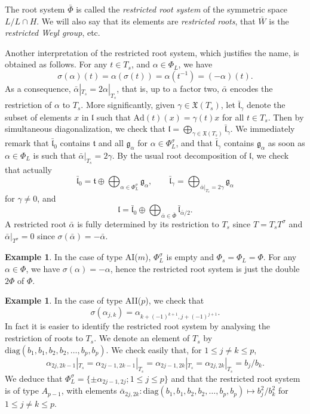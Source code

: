 \documentclass{amsart}
\theoremstyle{definition}
\newtheorem{exa}[thm]{Example}
\begin{document}
The root system $\bar{\Phi}$ is called the \emph{restricted root system} of the 
symmetric space $L/L\cap H$. We will also say that its elements are 
\emph{restricted roots}, that $\bar{W}$ is the \emph{restricted Weyl group}, 
etc.

Another interpretation of the restricted root system, which justifies the name, 
is obtained as follows. 
For any $t\in T_s$, and $\alpha\in \Phi_L$, we have 
\[
\sigma(\alpha)(t)=\alpha(\sigma(t))=\alpha(t^{-1})=(-\alpha)(t).
\]
As a consequence, $\bar{\alpha}|_{T_s}=2\alpha|_{T_s}$, 
that is, up to a factor two, $\bar{\alpha}$ encodes the restriction 
of $\alpha$ to $T_s$.
More significantly, given $\gamma\in \mathfrak{X}(T_s)$, let 
$\bar{\mathfrak{l}}_{\gamma}$ denote the subset of elements $x$ in 
$\mathfrak{l}$ such that $\mathrm{Ad}(t)(x)=\gamma(t)x$ for 
all $t\in T_s$. Then by simultaneous diagonalization, we check that 
$
\mathfrak{l} = \bigoplus_{\gamma\in \mathfrak{X}(T_s)} \bar{\mathfrak{l}}_{\gamma}.
$
We immediately remark that 
$\bar{\mathfrak{l}}_0$ contains $\mathfrak{t}$ and all 
$\mathfrak{g}_{\alpha}$ for $\alpha \in  \Phi_L^{\sigma}$, and 
that $\bar{\mathfrak{l}}_{\gamma}$ contains $\mathfrak{g}_{\alpha}$
as soon as $\alpha\in \Phi_L$ is such that $\bar{\alpha}|_{T_s}=2\gamma$.
By the usual root decomposition of $\mathfrak{l}$, we check that 
actually 
\[
\bar{\mathfrak{l}}_0=\mathfrak{t}\oplus\bigoplus_{\alpha\in \Phi_L^{\sigma}}\mathfrak{g}_{\alpha},
\qquad 
\bar{\mathfrak{l}}_{\gamma} = \bigoplus_{\bar{\alpha}|_{T_s}=2\gamma}\mathfrak{g}_{\alpha}
\] 
for $\gamma \neq 0$, and 
\[
\mathfrak{l} = \bar{\mathfrak{l}}_0 \oplus 
\bigoplus_{\bar{\alpha}\in \bar{\Phi}} \bar{\mathfrak{l}}_{\bar{\alpha}/2}.
\]
A restricted root $\bar{\alpha}$ is fully determined by its restriction 
to $T_s$ since $T=T_sT^{\sigma}$ and $\bar{\alpha}|_{T^{\sigma}}=0$ 
since $\sigma(\bar{\alpha})=-\bar{\alpha}$.

\begin{exa}
\label{exa_restricted_AI}
In the case of type AI($m$), $\Phi_L^{\sigma}$ is empty and $\Phi_s=\Phi_L=\Phi$.
For any $\alpha\in \Phi$, we have $\sigma(\alpha)=-\alpha$, hence the 
restricted root system is just the double $2\Phi$ of $\Phi$.
\end{exa}

\begin{exa}
\label{exa_restricted_AII}
In the case of type AII($p$), we check that 
\[
\sigma(\alpha_{j,k})=\alpha_{k+(-1)^{k+1},j+(-1)^{j+1}}.
\] 
In fact it is easier to identify the restricted root system by analysing
the restriction of roots to $T_s$. We denote an element of $T_s$ 
by $\mathrm{diag}(b_1,b_1,b_2,b_2,\ldots,b_p,b_p)$.
We check easily that, for $1\leq j\neq k \leq p$,
\[
\alpha_{2j,2k-1}|_{T_s}=\alpha_{2j-1,2k-1}|_{T_s}
=\alpha_{2j-1,2k}|_{T_s}=\alpha_{2j,2k}|_{T_s}
=b_j/b_k.
\]
We deduce that 
$\Phi_L^{\sigma}=\{\pm\alpha_{2j-1,2j};1\leq j\leq p\}$
and that the restricted root system is of type 
$A_{p-1}$, with elements 
$\bar{\alpha}_{2j,2k} : 
\mathrm{diag}(b_1,b_1,b_2,b_2,\ldots,b_p,b_p) \mapsto b_j^2/b_k^2$
for $1\leq j\neq k \leq p$.
\end{exa}
\end{document}
